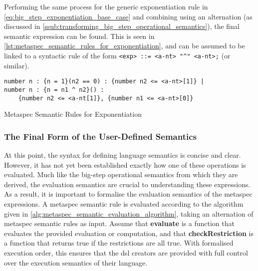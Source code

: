 Performing the same process for the generic exponentiation rule in \autoref{eq:big_step_exponentiation_base_case} and combining using an alternation (as discussed in \autoref{ssub:transforming_big_step_operational_semantics}), the final semantic expression can be found.
This is seen in \autoref{lst:metaspec_semantic_rules_for_exponentiation}, and can be assumed to be linked to a syntactic rule of the form \texttt{<exp> ::= <a-nt> "^" <a-nt>;} (or similar).

\begin{listing}[!htb]
\begin{verbatim}
number n : {n = 1}(n2 == 0) : {number n2 <= <a-nt>[1]} |
number n : {n = n1 ^ n2}() : 
    {number n2 <= <a-nt[1]}, {number n1 <= <a-nt>[0]}
\end{verbatim}
\caption{Metaspec Semantic Rules for Exponentiation}
\label{lst:metaspec_semantic_rules_for_exponentiation}
\end{listing}



\subsubsection{The Final Form of the User-Defined Semantics} %
\label{ssub:the_final_form_of_the_user_defined_semantics}
At this point, the syntax for defining language semantics is concise and clear.
However, it has not yet been established exactly how one of these operations is evaluated.
Much like the big-step operational semantics from which they are derived, the evaluation semantics are crucial to understanding these expressions. \\

As a result, it is important to formalise the evaluation semantics of the metaspec expressions. 
A metaspec semantic rule is evaluated according to the algorithm given in \autoref{alg:metaspec_semantic_evaluation_algorithm}, taking an alternation of metaspec semantic rules as input.
Assume that \textbf{evaluate} is a function that evaluates the provided evaluation or computation, and that \textbf{checkRestriction} is a function that returns true if the restrictions are all true.
With formalised execution order, this ensures that the \gls{dsl} creators are provided with full control over the execution semantics of their language.

